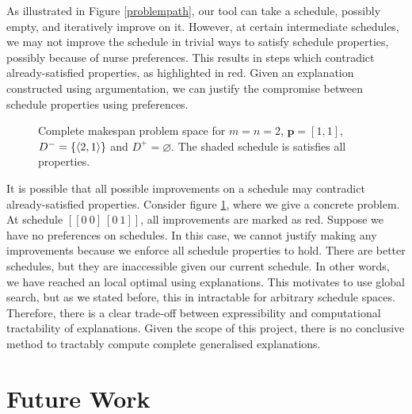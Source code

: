 As illustrated in Figure \ref{problempath}, our tool can take a schedule, possibly empty, and iteratively improve on it. However, at certain intermediate schedules, we may not improve the schedule in trivial ways to satisfy schedule properties, possibly because of nurse preferences. This results in steps which contradict already-satisfied properties, as highlighted in red. Given an explanation constructed using argumentation, we can justify the compromise between schedule properties using preferences.

\begin{figure}[H]
	\label{problemspace}
	
	\caption{Complete makespan problem space for $m=n=2$, $\mathbf{p}=[1,1]$, $D^-=\{\langle{2},{1}\rangle\}$ and $D^+=\varnothing$. The shaded schedule is satisfies all properties.}
\end{figure}

It is possible that all possible improvements on a schedule may contradict already-satisfied properties. Consider figure \ref{problemspace}, where we give a concrete problem. At schedule $[[0\ 0]\ [0\ 1]]$, all improvements are marked as red. Suppose we have no preferences on schedules. In this case, we cannot justify making any improvements because we enforce all schedule properties to hold. There are better schedules, but they are inaccessible given our current schedule. In other words, we have reached an local optimal using explanations. This motivates to use global search, but as we stated before, this in intractable for arbitrary schedule spaces. Therefore, there is a clear trade-off between expressibility and computational tractability of explanations. Given the scope of this project, there is no conclusive method to tractably compute complete generalised explanations.

\section{Future Work}

